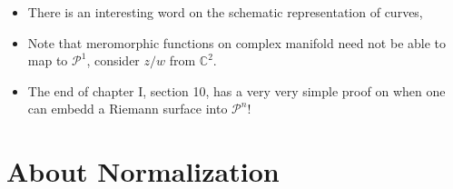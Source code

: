 \documentclass{book}
\newcommand{\C}{{\mathbb{C}}}
\newcommand{\CP}{{\mathcal{P}}}
\begin{document}
\begin{itemize}
  \item There is an interesting word on the schematic representation of curves,
    \cite[p.28]{a.griffithsIntroductionAlgebraicCurves}
  \item Note that meromorphic functions on complex manifold need not be able to map to $\CP^1$, consider $z/w$
    from $\C^2$.
    \item The end of chapter I, section 10, has a very very simple proof on when one can embedd a Riemann
      surface into $\CP^n$!
\end{itemize}

\section{About Normalization}
\end{document}
